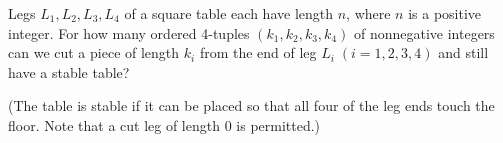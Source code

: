 Legs $L_1, L_2, L_3, L_4$ of a square table each have  length $n$,  where $n$ is a positive integer.  For how many ordered  4-tuples $(k_1, k_2, k_3, k_4)$ of nonnegative integers can we cut  a piece of length $k_i$ from the end of leg $L_i \; (i=1,2,3,4)$ and still have a stable table?

(The table is stable if it can be placed so that  all four of the leg ends touch the floor. Note that a cut leg of length 0 is permitted.)